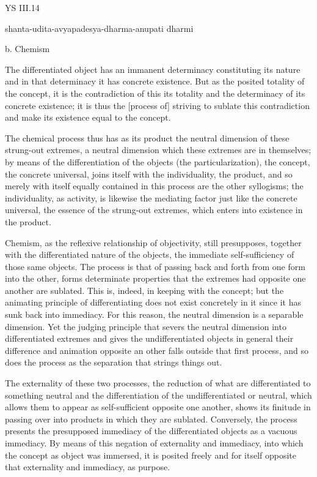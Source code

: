 YS III.14

shanta-udita-avyapadesya-dharma-anupati dharmi

b. Chemism

The differentiated object has an immanent determinacy
constituting its nature and in that determinacy
it has concrete existence.
But as the posited totality of the concept,
it is the contradiction of this its totality
and the determinacy of its concrete existence;
it is thus the [process of] striving to sublate this contradiction
and make its existence equal to the concept.

The chemical process thus has as its product
the neutral dimension of these strung-out extremes,
a neutral dimension which these extremes are in themselves;
by means of the differentiation of the objects (the particularization),
the concept, the concrete universal, joins itself
with the individuality, the product,
and so merely with itself equally contained
in this process are the other syllogisms;
the individuality, as activity, is likewise
the mediating factor just like the concrete universal,
the essence of the strung-out extremes,
which enters into existence in the product.

Chemism, as the reflexive relationship of objectivity,
still presupposes, together with
the differentiated nature of the objects,
the immediate self-sufficiency of those same objects.
The process is that of passing back and forth
from one form into the other,
forms determinate properties that the extremes
had opposite one another are sublated.
This is, indeed, in keeping with the concept;
but the animating principle of differentiating
does not exist concretely in it
since it has sunk back into immediacy.
For this reason, the neutral dimension
is a separable dimension.
Yet the judging principle that severs
the neutral dimension into differentiated extremes
and gives the undifferentiated objects in general
their difference and animation opposite an other
falls outside that first process,
and so does the process as
the separation that strings things out.

The externality of these two processes,
the reduction of what are differentiated to something neutral
and the differentiation of the undifferentiated or neutral,
which allows them to appear as self-sufficient opposite one another,
shows its finitude in passing over into products
in which they are sublated.
Conversely, the process presents the presupposed immediacy
of the differentiated objects as a vacuous immediacy.
By means of this negation of externality and immediacy,
into which the concept as object was immersed,
it is posited freely and for itself
opposite that externality and immediacy,
as purpose.

